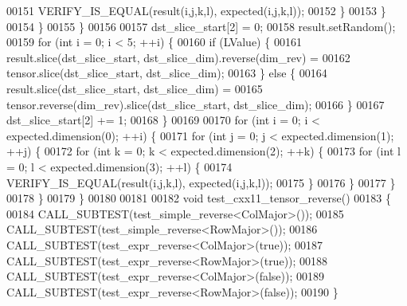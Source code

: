 \begin{DoxyCode}
00151           VERIFY\_IS\_EQUAL(result(i,j,k,l), expected(i,j,k,l));
00152         \}
00153       \}
00154     \}
00155   \}
00156 
00157   dst\_slice\_start[2] = 0;
00158   result.setRandom();
00159   \textcolor{keywordflow}{for} (\textcolor{keywordtype}{int} i = 0; i < 5; ++i) \{
00160      \textcolor{keywordflow}{if} (LValue) \{
00161        result.slice(dst\_slice\_start, dst\_slice\_dim).reverse(dim\_rev) =
00162            tensor.slice(dst\_slice\_start, dst\_slice\_dim);
00163      \} \textcolor{keywordflow}{else} \{
00164        result.slice(dst\_slice\_start, dst\_slice\_dim) =
00165            tensor.reverse(dim\_rev).slice(dst\_slice\_start, dst\_slice\_dim);
00166      \}
00167     dst\_slice\_start[2] += 1;
00168   \}
00169 
00170   \textcolor{keywordflow}{for} (\textcolor{keywordtype}{int} i = 0; i < expected.dimension(0); ++i) \{
00171     \textcolor{keywordflow}{for} (\textcolor{keywordtype}{int} j = 0; j < expected.dimension(1); ++j) \{
00172       \textcolor{keywordflow}{for} (\textcolor{keywordtype}{int} k = 0; k < expected.dimension(2); ++k) \{
00173         \textcolor{keywordflow}{for} (\textcolor{keywordtype}{int} l = 0; l < expected.dimension(3); ++l) \{
00174           VERIFY\_IS\_EQUAL(result(i,j,k,l), expected(i,j,k,l));
00175         \}
00176       \}
00177     \}
00178   \}
00179 \}
00180 
00181 
00182 \textcolor{keywordtype}{void} test\_cxx11\_tensor\_reverse()
00183 \{
00184   CALL\_SUBTEST(test\_simple\_reverse<ColMajor>());
00185   CALL\_SUBTEST(test\_simple\_reverse<RowMajor>());
00186   CALL\_SUBTEST(test\_expr\_reverse<ColMajor>(\textcolor{keyword}{true}));
00187   CALL\_SUBTEST(test\_expr\_reverse<RowMajor>(\textcolor{keyword}{true}));
00188   CALL\_SUBTEST(test\_expr\_reverse<ColMajor>(\textcolor{keyword}{false}));
00189   CALL\_SUBTEST(test\_expr\_reverse<RowMajor>(\textcolor{keyword}{false}));
00190 \}
\end{DoxyCode}

